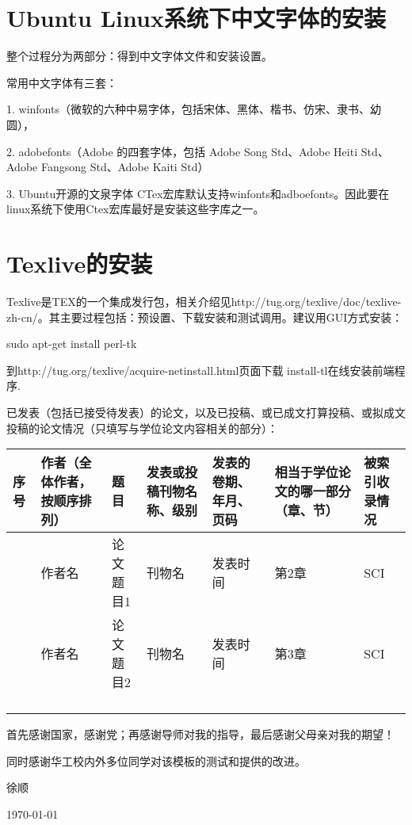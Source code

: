 \documentclass[unicode,pdfcover]{scutthesis}
\begin{document}
\backmatter




\section{Ubuntu Linux系统下中文字体的安装}
\label{sec:ubuntuzhfont}
整个过程分为两部分：得到中文字体文件和安装设置。

常用中文字体有三套：

1. winfonts（微软的六种中易字体，包括宋体、黑体、楷书、仿宋、隶书、幼圆），

2. adobefonts（Adobe 的四套字体，包括 Adobe Song Std、Adobe Heiti Std、Adobe
Fangsong Std、Adobe Kaiti Std）

3. Ubuntu开源的文泉字体
CTex宏库默认支持winfonts和adboefonts。因此要在linux系统下使用Ctex宏库最好是安装这些字库之一。

\section{Texlive的安装}

\label{sec:texlive_install}

Texlive是TEX的一个集成发行包，相关介绍见http://tug.org/texlive/doc/texlive-zh-cn/。其主要过程包括：预设置、下载安装和测试调用。建议用GUI方式安装：

sudo apt-get install perl-tk 

到http://tug.org/texlive/acquire-netinstall.html页面下载 install-tl在线安装前端程序.



已发表（包括已接受待发表）的论文，以及已投稿、或已成文打算投稿、或拟成文投稿的论文情况（只填写与学位论文内容相关的部分）：

\begin{table}
\begin{longtable}{|>{\centering}m{0.5cm}|>{\centering}m{2.3cm}|>{\centering}m{3.5cm}|>{\centering}m{2.6cm}|>{\centering}m{2cm}|>{\centering}m{1.3cm}|>{\centering}m{0.9cm}|}
\hline 
序号 & 作者（全体作者，按顺序排列） & 题 目 & 发表或投稿刊物名称、级别 & 发表的卷期、年月、页码 & 相当于学位论文的哪一部分（章、节） & 被索引收录情况\tabularnewline
\hline 
1 & 作者名 & 论文题目1 & 刊物名 & 发表时间 & 第2章 & SCI\tabularnewline
\hline 
2 & 作者名 & 论文题目2 & 刊物名 & 发表时间 & 第3章 & SCI\tabularnewline
\hline 
 &  &  &  &  &  & \tabularnewline
\hline 
 &  &  &  &  &  & \tabularnewline
\hline 
 &  &  &  &  &  & \tabularnewline
\hline 
 &  &  &  &  &  & \tabularnewline
\hline 
\end{longtable}
\end{table}




首先感谢国家，感谢党；再感谢导师对我的指导，最后感谢父母亲对我的期望！

同时感谢华工校内外多位同学对该模板的测试和提供的改进。

\begin{minipage}[t]{0.8\columnwidth}%
\begin{flushright}
徐顺 
\par\end{flushright}

\begin{flushright}
\today
\par\end{flushright}%
\end{minipage}
\end{document}
